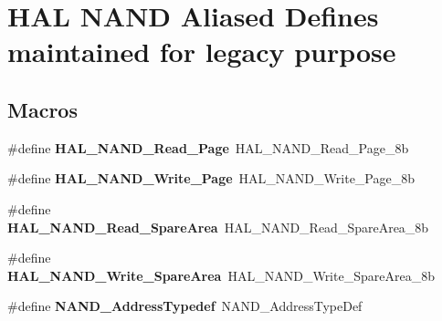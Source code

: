 \hypertarget{group___h_a_l___n_a_n_d___aliased___defines}{}\section{H\+AL N\+A\+ND Aliased Defines maintained for legacy purpose}
\label{group___h_a_l___n_a_n_d___aliased___defines}
\subsection*{Macros}
\begin{DoxyCompactItemize}
\item 
\mbox{\label{group___h_a_l___n_a_n_d___aliased___defines_ga042b596f4c19c36ccc75780341b36439}} 
\#define {\bfseries H\+A\+L\+\_\+\+N\+A\+N\+D\+\_\+\+Read\+\_\+\+Page}~H\+A\+L\+\_\+\+N\+A\+N\+D\+\_\+\+Read\+\_\+\+Page\+\_\+8b
\item 
\mbox{\label{group___h_a_l___n_a_n_d___aliased___defines_gae90b404d2ee2c8b4b82b949a129b2e61}} 
\#define {\bfseries H\+A\+L\+\_\+\+N\+A\+N\+D\+\_\+\+Write\+\_\+\+Page}~H\+A\+L\+\_\+\+N\+A\+N\+D\+\_\+\+Write\+\_\+\+Page\+\_\+8b
\item 
\mbox{\label{group___h_a_l___n_a_n_d___aliased___defines_gac185e8ab0a9ca5a4d67d1cde47c881c4}} 
\#define {\bfseries H\+A\+L\+\_\+\+N\+A\+N\+D\+\_\+\+Read\+\_\+\+Spare\+Area}~H\+A\+L\+\_\+\+N\+A\+N\+D\+\_\+\+Read\+\_\+\+Spare\+Area\+\_\+8b
\item 
\mbox{\label{group___h_a_l___n_a_n_d___aliased___defines_ga6f54130ce2531ca52862006428e50e9d}} 
\#define {\bfseries H\+A\+L\+\_\+\+N\+A\+N\+D\+\_\+\+Write\+\_\+\+Spare\+Area}~H\+A\+L\+\_\+\+N\+A\+N\+D\+\_\+\+Write\+\_\+\+Spare\+Area\+\_\+8b
\item 
\mbox{\label{group___h_a_l___n_a_n_d___aliased___defines_gab3708b27e7380fc5270b5196b71b93aa}} 
\#define {\bfseries N\+A\+N\+D\+\_\+\+Address\+Typedef}~N\+A\+N\+D\+\_\+\+Address\+Type\+Def
\item 
\mbox{\label{group___h_a_l___n_a_n_d___aliased___defines_gaeaae78138cfccceb8668c896eb8fb634}} 

\end{DoxyCompactItemize}
